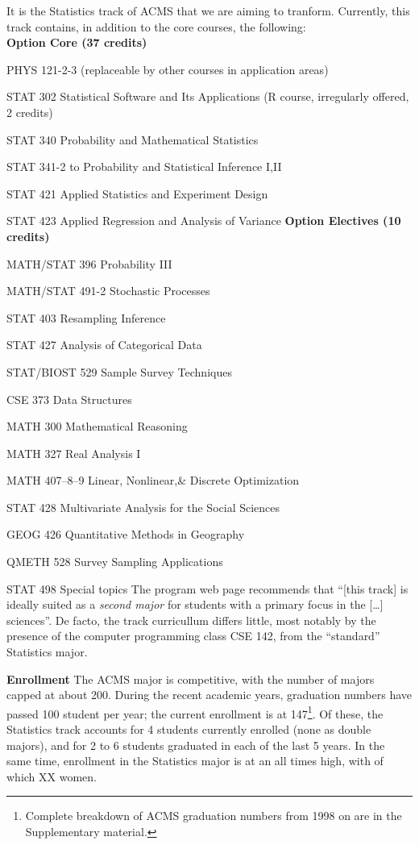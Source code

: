 It is the Statistics track of ACMS that we are aiming to
tranform. Currently, this track contains, in addition to the core
courses, the following:
\\
{\bf Option Core (37 credits)}
\bits
    \item {\sc PHYS 121-2-3} (replaceable by other courses in application areas)
    \item {\sc STAT 302} Statistical Software and Its Applications (R course, irregularly offered, 2 credits)
    \item {\sc STAT 340} Probability and Mathematical Statistics
    \item {\sc STAT 341-2} to Probability and Statistical Inference I,II
    \item {\sc STAT 421} Applied Statistics and Experiment Design
    \item {\sc STAT 423} Applied Regression and Analysis of Variance
\eits
{\bf Option Electives (10 credits)}
\bits
    \item {\sc MATH/STAT 396} Probability III
    \item {\sc MATH/STAT 491-2} Stochastic Processes
    \item {\sc STAT 403}  Resampling Inference
    \item {\sc STAT 427}  Analysis of Categorical Data
    \item {\sc STAT/BIOST 529} Sample Survey Techniques
    \item {\sc CSE 373} Data Structures
    \item {\sc MATH 300} Mathematical Reasoning
    \item {\sc MATH 327}  Real Analysis I
    \item {\sc MATH 407--8--9} Linear, Nonlinear,\& Discrete Optimization
    \item {\sc STAT 428} Multivariate Analysis for the Social Sciences
    \item {\sc GEOG 426} Quantitative Methods in Geography
    \item {\sc QMETH 528} Survey Sampling Applications
    \item {\sc STAT 498} Special topics
\eits
The program web page recommends that ``[this track] is ideally suited as a {\em second major} for students with a primary focus in the [\ldots] sciences''.
De facto, the track curricullum differs little, most notably by the
presence of the computer programming class {\sc CSE 142}, from the
``standard'' Statistics major.

{\bf Enrollment} The ACMS major is competitive, with the number of
majors capped at about 200.  During the recent academic years,
graduation numbers have passed 100 student per year; the current
enrollment is at 147\footnote{Complete breakdown of ACMS graduation
  numbers from 1998 on are in the Supplementary material.}.  Of these,
the Statistics track accounts for 4 students currently enrolled (none
as double majors), and for 2 to 6 students graduated in each of the
last 5 years. In the same time, enrollment in the Statistics major is
at an all times high, with  of which XX women.

